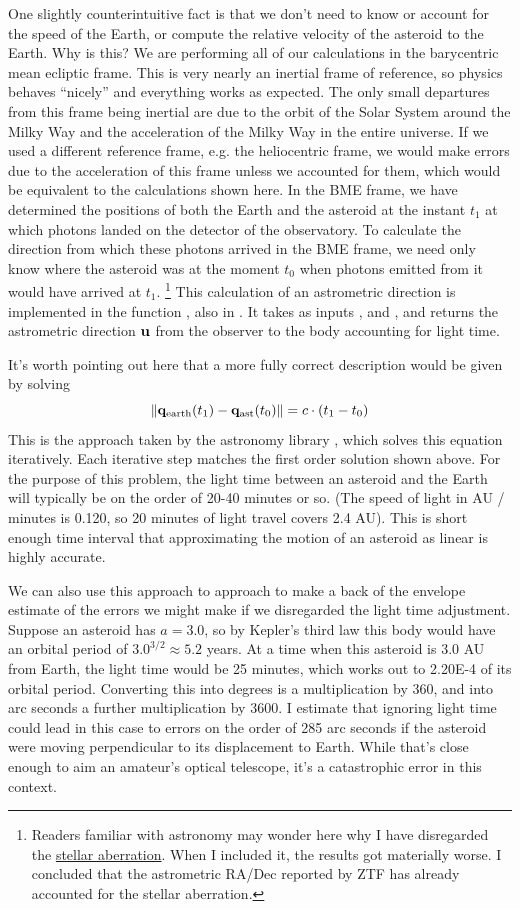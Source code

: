 One slightly counterintuitive fact is that we don't need to know or account for the speed of the Earth, 
or compute the relative velocity of the asteroid to the Earth. 
Why is this?
We are performing all of our calculations in the barycentric mean ecliptic frame.
This is very nearly an inertial frame of reference, so physics behaves ``nicely'' and everything works as expected.
The only small departures from this frame being inertial are due to the orbit of the Solar System around the Milky Way
and the acceleration of the Milky Way in the entire universe.
If we used a different reference frame, e.g. the heliocentric frame, we would make errors due to the acceleration of this frame 
unless we accounted for them, which would be equivalent to the calculations shown here.
In the BME frame, we have determined the positions of both the Earth and the asteroid at the instant $t_1$ at which 
photons landed on the detector of the observatory.
To calculate the direction from which these photons arrived in the BME frame, we need only know where the asteroid was at the moment
$t_0$ when photons emitted from it would have arrived at $t_1$.
\footnote{Readers familiar with astronomy may wonder here why I have disregarded the 
\href{https://en.wikipedia.org/wiki/Aberration_(astronomy)}{stellar aberration}.
When I included it, the results got materially worse.
I concluded that the astrometric RA/Dec reported by ZTF has already accounted for the stellar aberration.}
This calculation of an astrometric direction is implemented in the function , also in .
It takes as inputs ,  and , and returns the astrometric direction $\mathbf{u}$
from the observer to the body accounting for light time.

It's worth pointing out here that a more fully correct description would be given by solving
$$ \lVert\mathbf{q}_{\mathrm{earth}}(t_1) - \mathbf{q}_{\mathrm{ast}}(t_0)\rVert = c \cdot (t_1 - t_0) $$
This is the approach taken by the astronomy library , which solves this equation iteratively.
Each iterative step matches the first order solution shown above.
For the purpose of this problem, the light time between an asteroid and the Earth will typically be on the order of 20-40 minutes or so.
(The speed of light in AU / minutes is 0.120, so 20 minutes of light travel covers 2.4 AU).
This is short enough time interval that approximating the motion of an asteroid as linear is highly accurate.

We can also use this approach to approach to make a back of the envelope estimate of the errors we might make if 
we disregarded the light time adjustment.
Suppose an asteroid has $a=3.0$, so by Kepler's third law this body would have an orbital period of $3.0^{3/2} \approx 5.2$ years.
At a time when this asteroid is 3.0 AU from Earth, the light time would be 25 minutes, which works out to 2.20E-4 of its orbital period.
Converting this into degrees is a multiplication by 360, and into arc seconds a further multiplication by 3600.
I estimate that ignoring light time could lead in this case to errors on the order of 285 arc seconds 
if the asteroid were moving perpendicular to its displacement to Earth.
While that's close enough to aim an amateur's optical telescope, it's a catastrophic error in this context.

